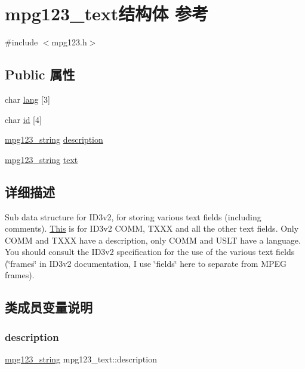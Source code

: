 \hypertarget{structmpg123__text}{}\section{mpg123\+\_\+text结构体 参考}
\label{structmpg123__text}


{\ttfamily \#include $<$mpg123.\+h$>$}

\subsection*{Public 属性}
\begin{DoxyCompactItemize}
\item 
char \hyperlink{structmpg123__text_a19f010dbd07ec10efa80d909768372e6}{lang} \mbox{[}3\mbox{]}
\item 
char \hyperlink{structmpg123__text_a8a75ed97a1d8a019a3944935c1339fdb}{id} \mbox{[}4\mbox{]}
\item 
\hyperlink{structmpg123__string}{mpg123\+\_\+string} \hyperlink{structmpg123__text_afc19e602b7a696d8a0ed03ae6b86f1bf}{description}
\item 
\hyperlink{structmpg123__string}{mpg123\+\_\+string} \hyperlink{structmpg123__text_a574b9464a996281f629858c0216eae18}{text}
\end{DoxyCompactItemize}


\subsection{详细描述}
Sub data structure for I\+D3v2, for storing various text fields (including comments). \hyperlink{namespace_this}{This} is for I\+D3v2 C\+O\+MM, T\+X\+XX and all the other text fields. Only C\+O\+MM and T\+X\+XX have a description, only C\+O\+MM and U\+S\+LT have a language. You should consult the I\+D3v2 specification for the use of the various text fields (\char`\"{}frames\char`\"{} in I\+D3v2 documentation, I use \char`\"{}fields\char`\"{} here to separate from M\+P\+EG frames). 

\subsection{类成员变量说明}
\mbox{\label{structmpg123__text_afc19e602b7a696d8a0ed03ae6b86f1bf}} 
\subsubsection{\texorpdfstring{description}{description}}
{\footnotesize\ttfamily \hyperlink{structmpg123__string}{mpg123\+\_\+string} mpg123\+\_\+text\+::description}

